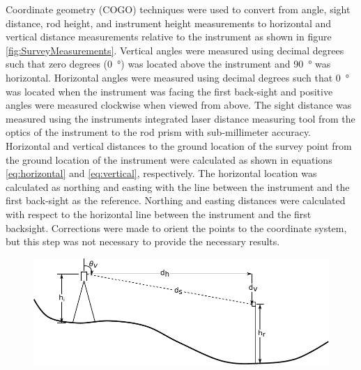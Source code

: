 \begin{linenumbers}
Coordinate geometry (COGO) techniques were used to convert from angle, sight distance, rod height, and instrument height measurements to horizontal and vertical distance measurements relative to the instrument as shown in figure \ref{fig:SurveyMeasurements}.  Vertical angles were measured using decimal degrees such that zero degrees (\SI{0}{\degree}) was located above the instrument and \SI{90}{\degree} was horizontal.  Horizontal angles were measured using decimal degrees such that \SI{0}{\degree} was located when the instrument was facing the first back-sight and positive angles were measured clockwise when viewed from above.  The sight distance was measured using the instruments integrated laser distance measuring tool from the optics of the instrument to the rod prism with sub-millimeter accuracy.  Horizontal and vertical distances to the ground location of the survey point from the ground location of the instrument were calculated as shown in equations \ref{eq:horizontal} and \ref{eq:vertical}, respectively.  The horizontal location was calculated as northing and easting with the line between the instrument and the first back-sight as the reference.  Northing and easting distances were calculated with respect to the horizontal line between the instrument and the first backsight.  Corrections were made to orient the points to the coordinate system, but this step was not necessary to provide the necessary results. %

\begin{figure}[htbp]
	\centering
	\includegraphics[scale=1]{Figures/LineDiagram/SurveyMeasurements}


\end{figure}
\end{linenumbers}
